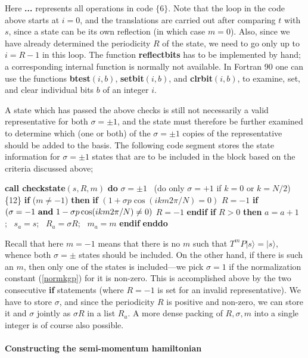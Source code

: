 \documentclass[draft,numberedheadings]{aipproc}
\newcommand{\code}{\null\vskip-2mm\noindent}
\newcommand{\br}{\hfill\break}
\newcommand{\cia}{\null\hskip5mm}
\newcommand{\cib}{\null\hskip10mm}
\newcommand{\cic}{\null\hskip15mm}
\begin{document}
\noindent
Here {\bf ...} represents all operations in code $\{6\}$. Note that the loop in the code above starts at $i=0$, and the translations are carried out after 
comparing $t$ with $s$, since a state can be its own reflection (in which case $m=0$). Also, since we have already determined the periodicity $R$ of the state, 
we need to go only up to $i=R-1$ in this loop. The function {\bf reflectbits} has to be implemented by hand; a corresponding internal function is normally
not available. In Fortran 90 one can use the functions {\bf btest}$(i,b)$, {\bf setbit}$(i,b)$, and {\bf clrbit}$(i,b)$, to examine, set, and clear 
individual bits $b$ of an integer $i$.

A state which has passed the above checks is still not necessarily a valid representative for both $\sigma=\pm 1$, and the state must therefore be further examined 
to determine which (one or both) of the $\sigma = \pm 1$ copies of the representative should be added to the basis. The following code segment stores the state 
information for $\sigma = \pm 1$ states that are to be included in the block based on the criteria discussed above;

{\code
\cia       {\bf call checkstate}$(s,R,m)$ \br      
\cia       {\bf do} $\sigma=\pm 1$~ (do only $\sigma=+1$ if $k=0$ or $k=N/2$) \hfill \{12\}\break
\cib           {\bf if} ($m\not=-1$) {\bf then} \br                       
\cic               {\bf if } $(1+\sigma p \cos(ikm2\pi/N)=0)$ $R=-1$ \br
\cic               {\bf if } $(\sigma=-1 {\bf ~and~} 1-\sigma p \cos(ikm2\pi/N)\not=0)$ $R=-1$ \br
\cib          {\bf endif} \br
\cib          {\bf if} $R>0$ {\bf then} $a=a+1$;~ $s_a=s$;~ $R_a=\sigma R$;~ $m_a=m$ {\bf endif} \br
\cia       {\bf enddo} 
\code}

\noindent
Recall that here $m=-1$ means that there is no $m$ such that $T^{m}P|s\rangle = |s\rangle$, whence both $\sigma=\pm$ states should be included. On the other
hand, if there is such an $m$, then only one of the states is included---we pick $\sigma=1$ if the normalization constant (\ref{normkgp}) for it is non-zero. 
This is accomplished above  by the two consecutive {\bf if} statements (where $R=-1$ is set for an invalid representative). We have to store $\sigma$, and since 
the periodicity $R$ is positive and non-zero, we can store it and $\sigma$ jointly as $\sigma R$ in a list $R_a$. A more dense packing of $R,\sigma,m$ into a single 
integer is of course also possible.

\paragraph{Constructing the semi-momentum hamiltonian}
\end{document}
